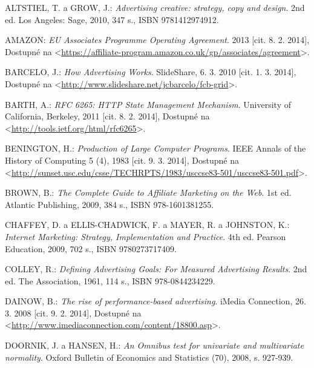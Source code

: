 \documentclass[12pt,oneside,openany]{fithesis}
\begin{document}

\begin{thebibliography}{99}



ALTSTIEL, T. a GROW, J.: \emph{Advertising creative: strategy, copy and design}. 2nd ed. Los Angeles: Sage, 2010, 347 s., ISBN 9781412974912.

AMAZON: \emph{EU Associates Programme Operating Agreement}. 2013 [cit. 8. 2. 2014], Dostupné na {\textless}\url{https://affiliate-program.amazon.co.uk/gp/associates/agreement}{\textgreater}.

BARCELO, J.: \emph{How Advertising Works}. SlideShare, 6. 3. 2010 [cit. 1. 3. 2014], Dostupné na {\textless}\url{http://www.slideshare.net/jcbarcelo/fcb-grid}{\textgreater}.

BARTH, A.: \emph{RFC 6265: HTTP State Management Mechanism}. University of California, Berkeley, 2011 [cit. 8. 2. 2014], Dostupné na {\textless}\url{http://tools.ietf.org/html/rfc6265}{\textgreater}.

BENINGTON, H.: \emph{Production of Large Computer Programs}. IEEE Annals of the History of Computing 5
        (4), 1983 [cit. 9. 3. 2014], Dostupné na {\textless}\url{http://sunset.usc.edu/csse/TECHRPTS/1983/usccse83-501/usccse83-501.pdf}{\textgreater}.

BROWN, B.: \emph{The Complete Guide to Affiliate Marketing on the Web}. 1st ed. Atlantic Publishing, 2009, 384 s., ISBN 978-1601381255.

CHAFFEY, D. a ELLIS-CHADWICK, F. a MAYER, R. a JOHNSTON, K.: \emph{Internet Marketing: Strategy, Implementation and Practice}. 4th ed. Pearson Education, 2009, 702 s., ISBN 9780273717409.

COLLEY, R.: \emph{Defining Advertising Goals: For Measured Advertising Results}. 2nd ed. The Association, 1961, 114 s., ISBN 978-0844234229.

DAINOW, B.: \emph{The rise of performance-based advertising}. iMedia Connection, 26. 3. 2008 [cit. 9. 2. 2014], Dostupné na {\textless}\url{http://www.imediaconnection.com/content/18800.asp}{\textgreater}.

DOORNIK, J. a HANSEN, H.: \emph{An Omnibus test for univariate and multivariate normality}.
Oxford Bulletin of Economics and Statistics (70), 2008, s. 927-939.


\end{thebibliography}
\end{document}
